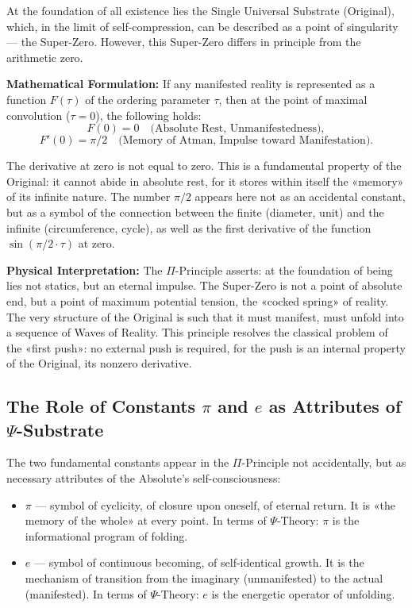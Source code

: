 \documentclass[a4paper,12pt]{article}
\begin{document}
	At the foundation of all existence lies the Single Universal Substrate (Original), which, in the limit of self-compression, can be described as a point of singularity — the Super-Zero. However, this Super-Zero differs in principle from the arithmetic zero.
	
	\textbf{Mathematical Formulation:} If any manifested reality is represented as a function $F(\tau)$ of the ordering parameter $\tau$, then at the point of maximal convolution ($\tau = 0$), the following holds:
	\[
	F(0) = 0 \quad \text{(Absolute Rest, Unmanifestedness)},
	\]
	\[
	F'(0) = \pi/2 \quad \text{(Memory of Atman, Impulse toward Manifestation)}.
	\]
	
	The derivative at zero is not equal to zero. This is a fundamental property of the Original: it cannot abide in absolute rest, for it stores within itself the «memory» of its infinite nature. The number $\pi/2$ appears here not as an accidental constant, but as a symbol of the connection between the finite (diameter, unit) and the infinite (circumference, cycle), as well as the first derivative of the function $\sin(\pi/2 \cdot \tau)$ at zero.
	
	\textbf{Physical Interpretation:} The $\Pi$-Principle asserts: at the foundation of being lies not statics, but an eternal impulse. The Super-Zero is not a point of absolute end, but a point of maximum potential tension, the «cocked spring» of reality. The very structure of the Original is such that it must manifest, must unfold into a sequence of Waves of Reality. This principle resolves the classical problem of the «first push»: no external push is required, for the push is an internal property of the Original, its nonzero derivative.
	
	\subsection{The Role of Constants $\pi$ and $e$ as Attributes of $\Psi$-Substrate}
	
	The two fundamental constants appear in the $\Pi$-Principle not accidentally, but as necessary attributes of the Absolute's self-consciousness:
	\begin{itemize}
		\item $\pi$ — symbol of cyclicity, of closure upon oneself, of eternal return. It is «the memory of the whole» at every point. In terms of $\Psi$-Theory: $\pi$ is the informational program of folding.
		\item $e$ — symbol of continuous becoming, of self-identical growth. It is the mechanism of transition from the imaginary (unmanifested) to the actual (manifested). In terms of $\Psi$-Theory: $e$ is the energetic operator of unfolding.
	\end{itemize}
	
\end{document}
